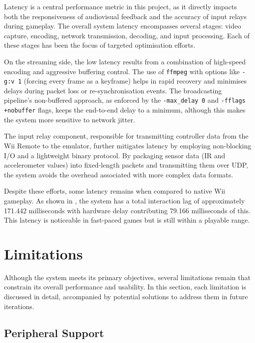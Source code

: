 Latency is a central performance metric in this project, as it directly impacts
both the responsiveness of audiovisual feedback and the accuracy of input relays
during gameplay. The overall system latency encompasses several stages: video
capture, encoding, network transmission, decoding, and input processing. Each of
these stages has been the focus of targeted optimisation efforts.

On the streaming side, the low latency results from a combination of
high-speed encoding and aggressive buffering control. The use of \texttt{ffmpeg}
with options like \texttt{-g:v 1} (forcing every frame as a keyframe) helps in
rapid recovery and minimises delays during packet loss or re-synchronisation
events. The broadcasting pipeline’s non-buffered approach, as enforced by the
\texttt{-max\_delay 0} and \texttt{-fflags +nobuffer} flags, keeps the
end-to-end delay to a minimum, although this makes the system more
sensitive to network jitter.

The input relay component, responsible for transmitting controller data from the
Wii Remote to the emulator, further mitigates latency by employing non-blocking
I/O and a lightweight binary protocol. By packaging sensor data (IR and
accelerometer values) into fixed-length packets and transmitting them over UDP,
the system avoids the overhead associated with more complex data formats.

Despite these efforts, some latency remains when compared to native Wii
gameplay. As shown in , the system has a total
interaction lag of approximately 171.442 milliseconds with hardware delay
contributing 79.166 milliseconds of this. This latency is noticeable in fast-paced
games but is still within a playable range.

\section{Limitations}

Although the system meets its primary objectives, several limitations remain that constrain its overall performance and usability. In this section, each limitation is discussed in detail, accompanied by potential solutions to address them in future iterations.

\subsection{Peripheral Support}

